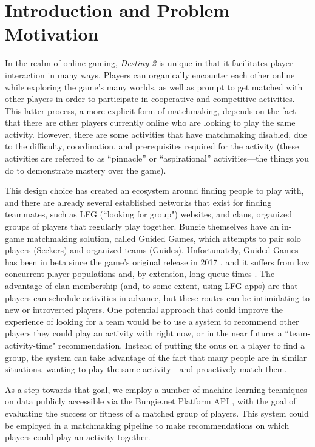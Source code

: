 \documentclass[conference]{IEEEtran}
\begin{document}
\section{Introduction and Problem Motivation}

In the realm of online gaming, \textit{Destiny 2} is unique in that it
facilitates player interaction in many ways. Players can organically encounter
each other online while exploring the game's many worlds, as well as prompt to
get matched with other players in order to participate in cooperative and
competitive activities. This latter process, a more explicit form of
matchmaking, depends on the fact that there are other players currently online
who are looking to play the same activity. However, there are some activities
that have matchmaking disabled, due to the difficulty, coordination, and
prerequisites required for the activity (these activities are referred to as
``pinnacle'' or ``aspirational'' activities—the things you do to demonstrate
mastery over the game).

This design choice has created an ecosystem around finding people to play with,
and there are already several established networks that exist for finding
teammates, such as LFG (``looking for group") websites, and clans, organized
groups of players that regularly play together. Bungie themselves have an
in-game matchmaking solution, called Guided Games, which attempts to pair solo
players (Seekers) and organized teams (Guides). Unfortunately, Guided Games has
been in beta since the game's original release in 2017 \cite{guided-games},
and it suffers from low concurrent player populations and, by extension, long
queue times \cite{problems}. The advantage of clan membership (and, to
some extent, using LFG apps) are that players can schedule activities in
advance, but these routes can be intimidating to new or introverted players.
One potential approach that could improve the experience of looking for a team
would be to use a system to recommend other players they could play an activity
with right now, or in the near future: a ``team-activity-time" recommendation.
Instead of putting the onus on a player to find a group, the system can take
advantage of the fact that many people are in similar situations, wanting to
play the same activity—and proactively match them.

As a step towards that goal, we employ a number of machine learning techniques
on data publicly accessible via the Bungie.net Platform API
\cite{api}, with the goal of evaluating the success or fitness of a
matched group of players. This system could be employed in a matchmaking
pipeline to make recommendations on which players could play an activity
together.
\end{document}
